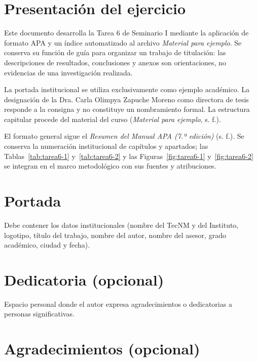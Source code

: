 
\section*{Presentación del ejercicio}

Este documento desarrolla la Tarea 6 de Seminario I mediante la aplicación de formato APA y un índice automatizado al archivo \emph{Material para ejemplo}. Se conserva su función de guía para organizar un trabajo de titulación: las descripciones de resultados, conclusiones y anexos son orientaciones, no evidencias de una investigación realizada.

La portada institucional se utiliza exclusivamente como ejemplo académico. La designación de la Dra. Carla Olimpya Zapuche Moreno como directora de tesis responde a la consigna y no constituye un nombramiento formal. La estructura capitular procede del material del curso (\emph{Material para ejemplo}, s. f.).

El formato general sigue el \emph{Resumen del Manual APA (7.ª edición)} (s. f.). Se conserva la numeración institucional de capítulos y apartados; las Tablas~\ref{tab:tarea6-1} y~\ref{tab:tarea6-2} y las Figuras~\ref{fig:tarea6-1} y~\ref{fig:tarea6-2} se integran en el marco metodológico con sus fuentes y atribuciones.

\section*{Portada}

Debe contener los datos institucionales (nombre del TecNM y del Instituto, logotipo, título del trabajo, nombre del autor, nombre del asesor, grado académico, ciudad y fecha).

\section*{Dedicatoria (opcional)}

Espacio personal donde el autor expresa agradecimientos o dedicatorias a personas significativas.

\section*{Agradecimientos (opcional)}

